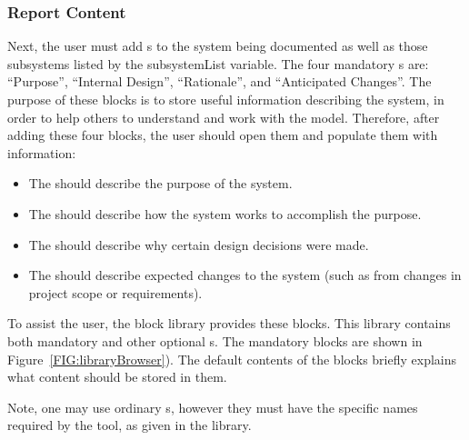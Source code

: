 \documentclass{article}
\begin{document}
\subsubsection{Report Content}
\label{SEC:ReportContent}
Next, the user must add s to the system being documented as well as those subsystems listed by the subsystemList variable. The four mandatory s are: ``Purpose'', ``Internal Design'', ``Rationale'', and ``Anticipated Changes''. The purpose of these blocks is to store useful information describing the system, in order to help others to understand and work with the model. Therefore, after adding these four blocks, the user should open them and populate them with information:

	\begin{itemize}
		\item The  should describe the purpose of the system.
		\item The  should describe how the system works to accomplish the purpose.
		\item The  should describe why certain design decisions were made.
		\item The  should describe expected changes to the system (such as from changes in project scope or requirements).
	\end{itemize}

To assist the user, the  block library provides these blocks. This library contains both mandatory and other optional s. The mandatory blocks are shown in Figure~\ref{FIG:libraryBrowser}). The default contents of the blocks briefly explains what content should be stored in them.

Note, one may use ordinary s, however they must have the specific names required by the tool, as given in the  library.
\end{document}
